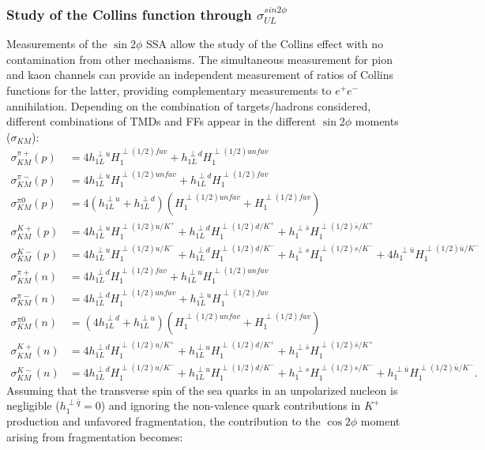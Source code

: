 \subsubsection{Study of the Collins function through $\sigma_{UL}^{sin2\phi}$}
%
Measurements of the $\sin2\phi$ SSA \cite{km_function} allow the study of the Collins effect with no contamination from other mechanisms. The simultaneous measurement for pion and kaon channels can provide an independent measurement of ratios of Collins functions for the latter, providing complementary measurements to $e^{+}e^{-}$ annihilation. Depending on the combination of targets/hadrons considered, different combinations of TMDs and FFs appear in the different $\sin2\phi$ moments ($\sigma_{KM}$):
%
\begin{align}
\sigma_{KM}^{\pi+}(p)&=4h_{1L}^{\perp u}H_1^{\perp(1/2) fav}+h_{1L}^{\perp d}H_1^{\perp(1/2) unfav} \\
\sigma_{KM}^{\pi-}(p)&=4h_{1L}^{\perp u}H_1^{\perp(1/2) unfav}+h_{1L}^{\perp d}H_1^{\perp(1/2) fav} \\
\sigma_{KM}^{\pi0}(p)&=4(h_{1L}^{\perp u}+h_{1L}^{\perp d})(H_1^{\perp(1/2) unfav}+H_1^{\perp(1/2) fav}) \\
\sigma_{KM}^{K+}(p)&=4h_{1L}^{\perp u}H_1^{\perp(1/2) u/K^+}+h_{1L}^{\perp d}H_1^{\perp(1/2) d/K^+}+h_1^{\perp \bar s}H_1^{\perp(1/2) \bar s/K^+}  \\
\sigma_{KM}^{K-}(p)&=4h_{1L}^{\perp u}H_1^{\perp(1/2) u/K^-}+h_{1L}^{\perp d}H_1^{\perp(1/2) d/K^-}+h_1^{\perp s}H_1^{\perp(1/2) s/K^-}+4h_1^{\perp \bar u}H_1^{\perp(1/2) \bar u/K^-} \\
\sigma_{KM}^{\pi+}(n)&=4h_{1L}^{\perp d}H_1^{\perp(1/2) fav}+h_{1L}^{\perp u}H_1^{\perp(1/2) unfav} \\
\sigma_{KM}^{\pi-}(n)&=4h_{1L}^{\perp d}H_1^{\perp(1/2) unfav}+h_{1L}^{\perp u}H_1^{\perp(1/2) fav} \\
\sigma_{KM}^{\pi0}(n)&=(4h_{1L}^{\perp d}+h_{1L}^{\perp u})(H_1^{\perp(1/2) unfav}+H_1^{\perp(1/2) fav}) \\
\sigma_{KM}^{K+}(n)&=4h_{1L}^{\perp d}H_1^{\perp(1/2) u/K^+}+h_{1L}^{\perp u}H_1^{\perp(1/2) d/K^+}+h_1^{\perp \bar s}H_1^{\perp(1/2) \bar s/K^+}  \\
\sigma_{KM}^{K-}(n)&=4h_{1L}^{\perp d}H_1^{\perp(1/2) u/K^-}+h_{1L}^{\perp u}H_1^{\perp(1/2) d/K^-}+h_1^{\perp s}H_1^{\perp(1/2) s/K^-}+h_1^{\perp \bar u}H_1^{\perp(1/2) \bar u/K^-} .
\label{eq:bm}
\end{align}
%
%
Assuming that the transverse spin of the sea quarks in an unpolarized nucleon is negligible ($h_{1}^{\perp \bar{q}} = 0$) and ignoring the non-valence quark contributions in $K^+$ production and unfavored fragmentation, the contribution to the $\cos2\phi$ moment arising from fragmentation becomes:
